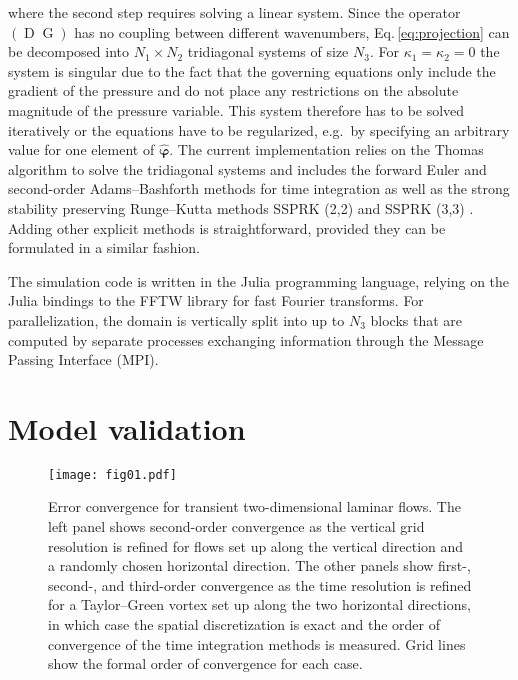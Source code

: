 \documentclass[gmd, manuscript]{copernicus}
\begin{document}
where the second step requires solving a linear system.
Since the operator \(\left(\operatorname{D}\operatorname{G}\right)\) has no coupling between different wavenumbers, Eq.\,\eqref{eq:projection} can be decomposed into \(N_1 \times N_2\) tridiagonal systems of size \(N_3\).
For \(\kappa_1= \kappa_2= 0\) the system is singular due to the fact that the governing equations only include the gradient of the pressure and do not place any restrictions on the absolute magnitude of the pressure variable.
This system therefore has to be solved iteratively or the equations have to be regularized, e.g.~by specifying an arbitrary value for one element of \(\boldsymbol{\hat{\varphi}}\).
The current implementation relies on the Thomas algorithm \citep{QuarteroniSaccoSaleri2007} to solve the tridiagonal systems and includes the forward Euler and second-order Adams--Bashforth methods for time integration as well as the strong stability preserving Runge--Kutta methods SSPRK (2,2) and SSPRK (3,3) \citep{GottliebKetchesonShu2009}.
Adding other explicit methods is straightforward, provided they can be formulated in a similar fashion.

The simulation code is written in the Julia programming language, relying on the Julia bindings to the FFTW library \citep{FrigoJohnson2005} for fast Fourier transforms.
For parallelization, the domain is vertically split into up to \(N_3\) blocks that are computed by separate processes exchanging information through the Message Passing Interface (MPI).

\hypertarget{sec:validation}{%
\section{Model validation}\label{sec:validation}}

\begin{figure*}[!t]%
  \centering
  \texttt{[image: fig01.pdf]}
  \caption{Error convergence for transient two-dimensional laminar flows. The left panel shows second-order convergence as the vertical grid resolution is refined for flows set up along the vertical direction and a randomly chosen horizontal direction.
  The other panels show first-, second-, and third-order convergence as the time resolution is refined for a Taylor–Green vortex set up along the two horizontal directions, in which case the spatial discretization is exact and the order of convergence of the time integration methods is measured. Grid lines show the formal order of convergence for each case.}\label{fig:validation-laminar}
\end{figure*}
\end{document}
